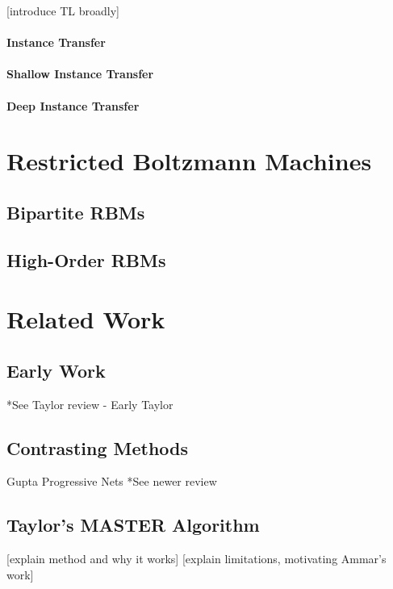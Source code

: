 \documentclass{article}
\begin{document}
[introduce TL broadly]

\paragraph{Instance Transfer}

\paragraph{Shallow Instance Transfer}

\paragraph{Deep Instance Transfer}

\section{Restricted Boltzmann Machines}

\subsection{Bipartite RBMs}

\subsection{High-Order RBMs}

\section{Related Work}

\subsection{Early Work}

*See Taylor review
- Early Taylor

\subsection{Contrasting Methods}

Gupta
Progressive Nets
*See newer review

\subsection{Taylor's MASTER Algorithm}

	[explain method and why it works]
	[explain limitations, motivating Ammar's work]
\end{document}

